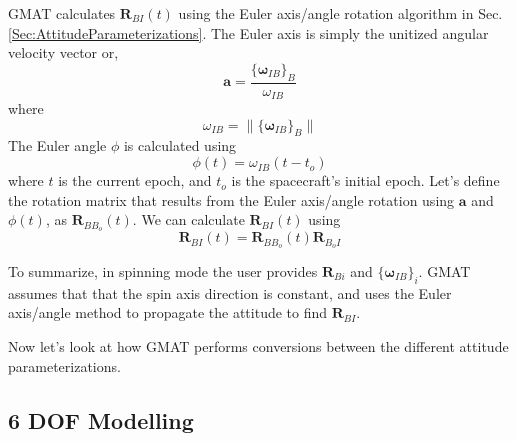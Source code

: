 GMAT calculates $\mathbf{R}_{BI}(t)$ using the Euler axis/angle
rotation algorithm in Sec. \ref{Sec:AttitudeParameterizations}. The
Euler axis is simply the unitized angular velocity vector or,
%
\begin{equation}
     \mathbf{a} =   \frac{  \{ \boldsymbol\omega_{IB} \}_B  }{\omega_{IB} }
\end{equation}
%
where
%
\begin{equation}
     \omega_{IB} = \| \{\boldsymbol{\omega}_{IB} \}_B \|
\end{equation}
%
The Euler angle $\phi$ is calculated using
%
\begin{equation}
    \phi(t) = \omega_{IB}(t -t_o)
\end{equation}
%
where $t$ is the current epoch, and $t_o$ is the spacecraft's
initial epoch.  Let's define the rotation matrix that results from
the Euler axis/angle rotation using $\mathbf{a}$ and $\phi(t)$, as
$\mathbf{R}_{BB_{o}}(t)$.  We can calculate $\mathbf{R}_{BI}(t)$
using
%
\begin{equation}
     \mathbf{R}_{BI}(t) =
     \mathbf{R}_{BB_{o}}(t)\mathbf{R}_{B_{o}I}
\end{equation}
%

To summarize, in spinning mode the user provides $\mathbf{R}_{Bi}$
and  $\{ \boldsymbol\omega_{IB}\}_i$.  GMAT assumes that that the
spin axis direction is constant, and uses the Euler axis/angle
method to propagate the attitude to find $\mathbf{R}_{BI}$.

Now let's look at how GMAT performs conversions between the
different attitude parameterizations.

\subsection{6 DOF Modelling}

